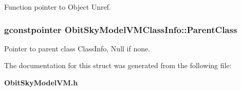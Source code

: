 Function pointer to Object Unref. 

\subsubsection{\setlength{\rightskip}{0pt plus 5cm}gconstpointer {\bf Obit\-Sky\-Model\-VMClass\-Info::Parent\-Class}}\label{structObitSkyModelVMClassInfo_o3}


Pointer to parent class Class\-Info, Null if none. 



The documentation for this struct was generated from the following file:\begin{CompactItemize}
\item 
{\bf Obit\-Sky\-Model\-VM.h}\end{CompactItemize}
